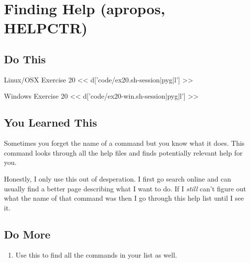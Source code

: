 \chapter{Finding Help (apropos, HELPCTR)}

\section{Do This}

\begin{code}{Linux/OSX Exercise 20}
<< d['code/ex20.sh-session|pyg|l'] >>
\end{code}

\begin{code}{Windows Exercise 20}
<< d['code/ex20-win.sh-session|pyg|l'] >>
\end{code}

\section{You Learned This}

Sometimes you forget the name of a command but you know what it does.  This command
looks through all the help files and finds potentially relevant help for you.

Honestly, I only use this out of desperation.  I first go search online and can
usually find a better page describing what I want to do.  If I \emph{still} can't
figure out what the name of that command was then I go through this help list
until I see it.

\section{Do More}

\begin{enumerate}
\item Use this to find all the commands in your list as well.
\end{enumerate}


